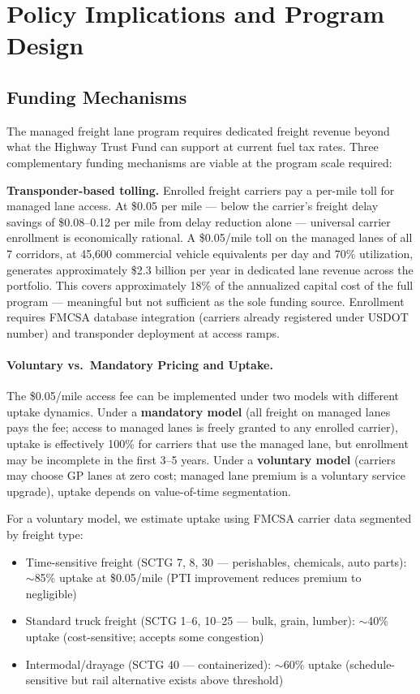 \section{Policy Implications and Program Design}
\label{sec:implications}

\subsection{Funding Mechanisms}

The managed freight lane program requires dedicated freight revenue beyond what the Highway Trust Fund can support at current fuel tax rates. Three complementary funding mechanisms are viable at the program scale required:

\textbf{Transponder-based tolling.} Enrolled freight carriers pay a per-mile toll for managed lane access. At \$0.05 per mile --- below the carrier's freight delay savings of \$0.08--0.12 per mile from delay reduction alone --- universal carrier enrollment is economically rational. A \$0.05/mile toll on the managed lanes of all 7 corridors, at 45,600 commercial vehicle equivalents per day and 70\% utilization, generates approximately \$2.3 billion per year in dedicated lane revenue across the portfolio. This covers approximately 18\% of the annualized capital cost of the full program --- meaningful but not sufficient as the sole funding source. Enrollment requires FMCSA database integration (carriers already registered under USDOT number) and transponder deployment at access ramps.

\paragraph{Voluntary vs.\ Mandatory Pricing and Uptake.}
The \$0.05/mile access fee can be implemented under two models with different
uptake dynamics. Under a \textbf{mandatory model} (all freight on managed lanes
pays the fee; access to managed lanes is freely granted to any enrolled carrier),
uptake is effectively 100\% for carriers that use the managed lane, but enrollment
may be incomplete in the first 3--5 years. Under a \textbf{voluntary model} (carriers
may choose GP lanes at zero cost; managed lane premium is a voluntary service
upgrade), uptake depends on value-of-time segmentation.

For a voluntary model, we estimate uptake using FMCSA carrier data segmented
by freight type:
\begin{itemize}
  \item Time-sensitive freight (SCTG 7, 8, 30 — perishables, chemicals, auto parts):
    $\sim$85\% uptake at \$0.05/mile (PTI improvement reduces premium to negligible)
  \item Standard truck freight (SCTG 1--6, 10--25 — bulk, grain, lumber):
    $\sim$40\% uptake (cost-sensitive; accepts some congestion)
  \item Intermodal/drayage (SCTG 40 — containerized): $\sim$60\% uptake
    (schedule-sensitive but rail alternative exists above threshold)
\end{itemize}

